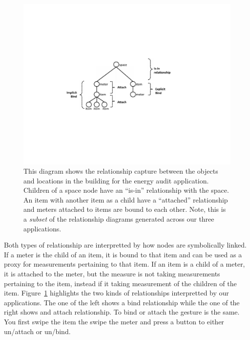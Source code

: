 \begin{figure}[htb!]
\begin{center}
\includegraphics[scale=0.55]{figs/bindattachstructs}
\caption{This diagram shows the relationship capture between the objects and locations in the building for the 
energy audit application.  Children of a space node have an ``is-in'' relationship with the space.  An item
with another item as a child have a ``attached'' relationship and meters attached to items are bound to each other.
Note, this is a \emph{subset} of the relationship diagrams generated across our three applications.}
\label{fig:attachandbind}
\end{center}
\end{figure}

Both types of relationship are interpretted by how nodes are symbolically linked.  If a meter is the child
of an item, it is bound to that item and can be used as a proxy for measurements pertaining to that item.
If an item is a child of a meter, it is attached to the meter, but the measure is not taking measurements
pertaining to the item, instead if it taking measurement of the children of the item.  Figure~\ref{fig:attachandbind}
highlights the two kinds of relationships interpretted by our applications.  The one of the left shows
a bind relationship while the one of the right shows and attach relationship.
To bind or attach the gesture is the same.  You first swipe the item the swipe the meter and press a button to either
un/attach or un/bind.

